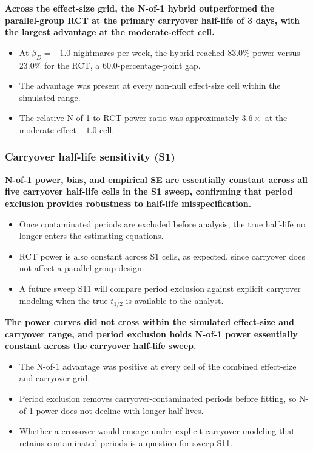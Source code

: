\documentclass[
  11pt,
]{article}
\begin{document}
\textbf{Across the effect-size grid, the N-of-1 hybrid outperformed the parallel-group RCT at the primary carryover half-life of 3 days, with the largest advantage at the moderate-effect cell.}

\begin{itemize}\setlength{\itemsep}{2pt}\setlength{\parskip}{0pt}
\item At $\beta_D = -1.0$ nightmares per week, the hybrid reached 83.0\% power versus 23.0\% for the RCT, a 60.0-percentage-point gap.
\item The advantage was present at every non-null effect-size cell within the simulated range.
\item The relative N-of-1-to-RCT power ratio was approximately $3.6\times$ at the moderate-effect $-1.0$ cell.
\end{itemize}

\subsubsection{Carryover half-life sensitivity (S1)}\label{carryover-half-life-sensitivity-s1}

\textbf{N-of-1 power, bias, and empirical SE are essentially constant across all five carryover half-life cells in the S1 sweep, confirming that period exclusion provides robustness to half-life misspecification.}

\begin{itemize}\setlength{\itemsep}{2pt}\setlength{\parskip}{0pt}
\item Once contaminated periods are excluded before analysis, the true half-life no longer enters the estimating equations.
\item RCT power is also constant across S1 cells, as expected, since carryover does not affect a parallel-group design.
\item A future sweep S11 will compare period exclusion against explicit carryover modeling when the true $t_{1/2}$ is available to the analyst.
\end{itemize}

\textbf{The power curves did not cross within the simulated effect-size and carryover range, and period exclusion holds N-of-1 power essentially constant across the carryover half-life sweep.}

\begin{itemize}\setlength{\itemsep}{2pt}\setlength{\parskip}{0pt}
\item The N-of-1 advantage was positive at every cell of the combined effect-size and carryover grid.
\item Period exclusion removes carryover-contaminated periods before fitting, so N-of-1 power does not decline with longer half-lives.
\item Whether a crossover would emerge under explicit carryover modeling that retains contaminated periods is a question for sweep S11.
\end{itemize}
\end{document}
